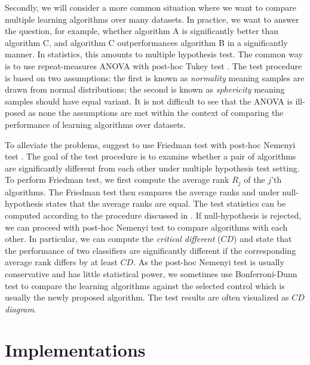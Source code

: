 {Secondly, we will consider a more common situation where we want to compare multiple learning algorithms over many datasets.
In practice, we want to answer the question, for example, whether algorithm A is significantly better than algorithm C, and algorithm C outperformances algorithm B in a significantly manner.
In statistics, this amounts to multiple hypothesis test.
The common way is to use repeat-measures ANOVA \citep{Fisher59statistical} with post-hoc Tukey test \citep{Turkey49comparing}. 
The test procedure is based on two assumptions: the first is known as \textit{normality} meaning samples are drawn from normal distributions; the second is known as \textit{sphericity} meaning samples should have equal variant.
It is not difficult to see that the ANOVA is ill-posed as none the assumptions are met within the context of comparing the performance of learning algorithms over datasets.

To alleviate the problems, \citet{Demsar06statistical} suggest to use Friedman test \citep{Friedman37the,Friedman40Comparison} with post-hoc Nemenyi test \citep{Nemenyi63distribution}.
The goal of the test procedure is to examine whether a pair of algorithms are significantly different from each other under multiple hypothesis test setting.
To perform Friedman test, we first compute the average rank $R_j$ of the $j$'th algorithms.
The Friedman test then compares the average ranks and under null-hypothesis states that the average ranks are equal.
The test statistics can be computed according to the procedure discussed in \citep{Demsar06statistical}.
If null-hypothesis is rejected, we can proceed with post-hoc Nemenyi test to compare algorithms with each other.
In particular, we can compute the \textit{critical different} ($CD$) and state that the performance of two classifiers are significantly different if the corresponding average rank differs by at least $CD$.
As the post-hoc Nemenyi test is usually conservative and has little statistical power, we sometimes use Bonferroni-Dunn test \citep{Dunn61mulitple} to compare the learning algorithms against the selected control which is usually the newly proposed algorithm.
The test results are often visualized as \textit{$CD$ diagram}.









%
%
\chapter{Implementations} \label{ch_implementation}

}
